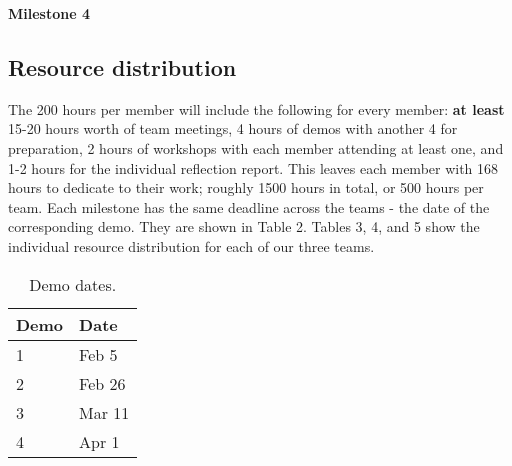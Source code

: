 \documentclass{article}
\begin{document}
{\bf Milestone 4}


\subsection{Resource distribution}

The 200 hours per member will include the following for every member: {\bf at least} 15-20 hours worth of team meetings, 4 hours of demos with another 4 for preparation, 2 hours of workshops with each member attending at least one, and 1-2 hours for the individual reflection report. This leaves each member with 168 hours to dedicate to their work; roughly 1500 hours in total, or 500 hours per team. Each milestone has the same deadline across the teams - the date of the corresponding demo. They are shown in Table 2. Tables 3, 4, and 5 show the individual resource distribution for each of our three teams.
\begin{table}[]
  \begin{center}
  \begin{tabular}{ll}
    \hline
    Demo & Date   \\
    \hline
    1 & Feb 5 \\
    2 & Feb 26 \\
    3 & Mar 11 \\
    4 & Apr 1\\ \hline
  \end{tabular}
  \end{center}
  \caption{Demo dates.}
\end{table}
\end{document}
